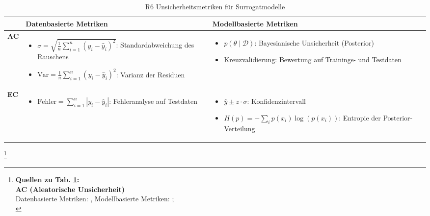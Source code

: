\begin{otherlanguage}{ngerman}
\begin{table}[htpb]
  \centering
  \scriptsize
  \begin{tabularx}{\textwidth}{|l|X|X|}
    \hline
    & \textbf{Datenbasierte Metriken} & \textbf{Modellbasierte Metriken} \\
    \hline
    \textbf{AC} & 
    \begin{itemize}[leftmargin=*,noitemsep,topsep=0pt]
      \item \( \sigma = \sqrt{\frac{1}{n} \sum_{i=1}^{n} (y_i - \hat{y}_i)^2} \): Standardabweichung des Rauschens
      \item \( \text{Var} = \frac{1}{n} \sum_{i=1}^{n} (y_i - \hat{y}_i)^2 \): Varianz der Residuen
    \end{itemize}
    &
    \begin{itemize}[leftmargin=*,noitemsep,topsep=0pt]
      \item \( p(\theta \mid \mathcal{D}) \): Bayesianische Unsicherheit (Posterior)
      \item Kreuzvalidierung: Bewertung auf Trainings- und Testdaten
    \end{itemize}
    \\
    \hline
    \textbf{EC} &
    \begin{itemize}[leftmargin=*,noitemsep,topsep=0pt]
      \item \( \text{Fehler} = \sum_{i=1}^{n} |y_i - \hat{y}_i| \): Fehleranalyse auf Testdaten
    \end{itemize}
    &
    \begin{itemize}[leftmargin=*,noitemsep,topsep=0pt]
      \item \( \hat{y} \pm z \cdot \sigma \): Konfidenzintervall
      \item \( H(p) = - \sum_{i} p(x_i) \log(p(x_i)) \): Entropie der Posterior-Verteilung
    \end{itemize}
    \\
    \hline
  \end{tabularx}
  \caption{R6 Unsicherheitsmetriken für Surrogatmodelle}
  \label{tab:chapter6r61}
\end{table}


\footnote{%
\begin{minipage}[t]{\textwidth}
\scriptsize
\textbf{Quellen zu Tab. \ref{tab:chapter6r61}:}\\[0.125em]
\textbf{AC (Aleatorische Unsicherheit)}\\
\quad Datenbasierte Metriken: \parencite[S.~28–30]{bishop2006pattern}, 
\quad Modellbasierte Metriken: \parencite[Kap.~2]{rasmussen2006gaussian}; \parencite{blundell2015weight}\\ [0.125em]


\end{minipage}}
\end{otherlanguage}
